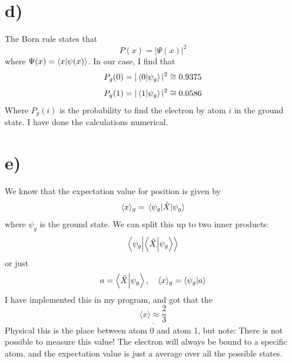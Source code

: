 \documentclass{scrartcl}
\begin{document}
\section*{d)}
The Born rule states that
$$P(x)=|\Psi(x)|^2$$
where $\Psi(x)=\braket{x}{\psi(x)}$. In our case, I find that
$$P_g(0)=|\braket{0}{\psi_g}|^2\cong0.9375$$
$$P_g(1)=|\braket{1}{\psi_g}|^2\cong0.0586$$
Where $P_g(i)$ is the probability to find the electron by atom $i$ in the ground state. I have done the calculations numerical.

\section*{e)}
We know that the expectation value for position is given by
$$\langle x\rangle_g=\mel{\psi_g}{\hat{X}}{\psi_g}$$
where $\psi_g$ is the ground state. We can split this up to two inner products:
$$\braket{\psi_g}{\braket{\hat{X}}{\psi_g}}$$
or just
$$a=\braket{\hat{X}}{\psi_g},\quad\langle x\rangle_g=\braket{\psi_g}{a}$$
I have implemented this in my program, and got that the
$$\underline{\langle x\rangle\approx\frac{2}{3}}$$
Physical this is the place between atom 0 and atom 1, but note: There is not possible to measure this value! The electron will always be bound to a specific atom, and the expectation value is just a average over all the possible states.
\end{document}
